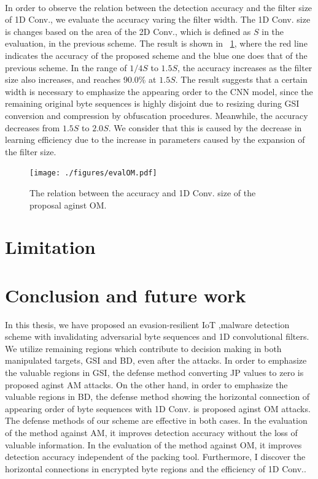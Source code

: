 \documentclass{ieeeaccess}
\begin{document}
\paragraph{}
In order to observe the relation between the detection accuracy and the filter size of 1D Conv., we evaluate the accuracy varing the filter width.
The 1D Conv. size is changes based on the area of the 2D Conv., which is defined as $S$ in the evaluation, in the previous scheme.
The result is shown in \figurename~\ref{fig:evalOM}, where the red line indicates the accuracy of the proposed scheme and the blue one does that of the previous scheme.
In the range of $1/4S$ to $1.5S$, the accuracy increases as the filter size also increases, and reaches 90.0\% at $1.5S$.
The result suggests that a certain width is necessary to emphasize the appearing order to the CNN model, since the remaining original byte sequences is highly disjoint due to resizing during GSI conversion and compression by obfuscation procedures.
Meanwhile, the accuracy decreases from $1.5S$ to $2.0S$.
We consider that this is caused by the decrease in learning efficiency due to the increase in parameters caused by the expansion of the filter size.

\begin{figure}[h]
 \centering
 \texttt{[image: ./figures/evalOM.pdf]}
 \caption{The relation between the accuracy and 1D Conv. size of the proposal aginst OM.} 
 \label{fig:evalOM}
\end{figure}

\section{Limitation} \label{sec:limitation}
\section{Conclusion and future work} \label{sec:conclusion}
In this thesis, we have proposed an evasion-resilient IoT ,malware detection scheme with invalidating adversarial byte sequences and 1D convolutional filters. 
We utilize remaining regions which contribute to decision making in both manipulated targets, GSI and BD, even after the attacks.
In order to emphasize the valuable regions in GSI, the defense method converting JP values to zero is proposed aginst AM attacks.
On the other hand, in order to emphasize the valuable regions in BD, the defense method showing the horizontal connection of appearing order of byte sequences with 1D Conv. is proposed aginst OM attacks.
The defense methods of our scheme are effective in both cases.
In the evaluation of the method against AM, it improves detection accuracy without the loss of valuable information.
In the evaluation of the method against OM, it improves detection accuracy independent of the packing tool.
Furthermore, I discover the horizontal connections in encrypted byte regions and the efficiency of 1D Conv..
\end{document}
